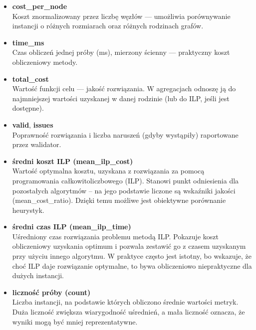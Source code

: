 \begin{itemize}
    \item \textbf{cost\_per\_node} \\
    Koszt znormalizowany przez liczbę węzłów — umożliwia porównywanie instancji o różnych rozmiarach oraz różnych rodzinach grafów.

    \item \textbf{time\_ms} \\
    Czas obliczeń jednej próby (ms), mierzony ścienny — praktyczny koszt obliczeniowy metody.

    \item \textbf{total\_cost} \\
    Wartość funkcji celu — jakość rozwiązania. W agregacjach odnoszę ją do najmniejszej wartości uzyskanej w danej rodzinie (lub do ILP, jeśli jest dostępne).

    \item \textbf{valid}, \textbf{issues} \\
    Poprawność rozwiązania i liczba naruszeń (gdyby wystąpiły) raportowane przez walidator.

    \item \textbf{średni koszt ILP (mean\_ilp\_cost)} \\
    Wartość optymalna kosztu, uzyskana z rozwiązania za pomocą programowania całkowitoliczbowego (ILP). 
    Stanowi punkt odniesienia dla pozostałych algorytmów – na jego podstawie liczone są wskaźniki jakości (mean\_cost\_ratio). 
    Dzięki temu możliwe jest obiektywne porównanie heurystyk.

    \item \textbf{średni czas ILP (mean\_ilp\_time)} \\
    Uśredniony czas rozwiązania problemu metodą ILP. 
    Pokazuje koszt obliczeniowy uzyskania optimum i pozwala zestawić go z czasem uzyskanym przy użyciu innego algorytmu. 
    W praktyce często jest istotny, bo wskazuje, że choć ILP daje rozwiązanie optymalne, 
    to bywa obliczeniowo niepraktyczne dla dużych instancji.

    \item \textbf{liczność próby (count)} \\
    Liczba instancji, na podstawie których obliczono średnie wartości metryk. 
    Duża liczność zwiększa wiarygodność uśrednień, a mała liczność oznacza, 
    że wyniki mogą być mniej reprezentatywne. 
\end{itemize}

